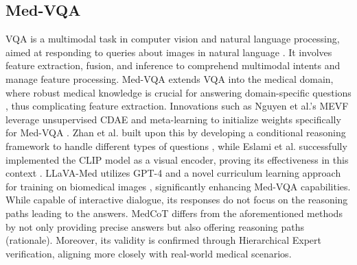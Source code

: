 \documentclass[11pt]{article}
\begin{document}
\subsection{Med-VQA}
VQA is a multimodal task in computer vision and natural language processing, aimed at responding to queries about images in natural language \cite{ben2019vqa,he2020pathvqa,ren2020cgmvqa}. It involves feature extraction, fusion, and inference to comprehend multimodal intents and manage feature processing. Med-VQA extends VQA into the medical domain, where robust medical knowledge is crucial for answering domain-specific questions \cite{liu2023parameter}, thus complicating feature extraction. Innovations such as Nguyen et al.'s MEVF leverage unsupervised CDAE and meta-learning to initialize weights specifically for Med-VQA \cite{nguyen2019overcoming}. Zhan et al. built upon this by developing a conditional reasoning framework to handle different types of questions \cite{zhan2020medical}, while Eslami et al. successfully implemented the CLIP model as a visual encoder, proving its effectiveness in this context \cite{eslami-etal-2023-pubmedclip}. LLaVA-Med utilizes GPT-4 and a novel curriculum learning approach for training on biomedical images \citet{li2024llava}, significantly enhancing Med-VQA capabilities. While capable of interactive dialogue, its responses do not focus on the reasoning paths leading to the answers. MedCoT differs from the aforementioned methods by not only providing precise answers but also offering reasoning paths (rationale). Moreover, its validity is confirmed through Hierarchical Expert verification, aligning more closely with real-world medical scenarios.
\end{document}
